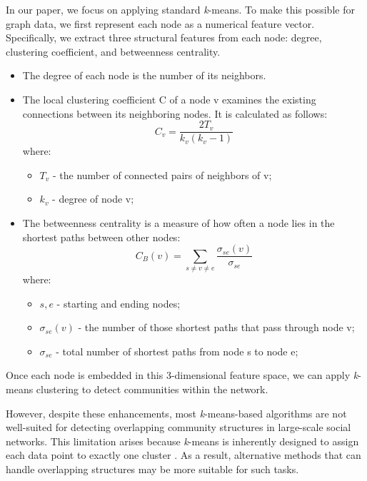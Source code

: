 \documentclass[conference]{IEEEtran}
\begin{document}
In our paper, we focus on applying standard \textit{k}-means. To make this possible for graph data, we first represent each node as a numerical feature vector. Specifically, we extract three structural features from each node: degree, clustering coefficient, and betweenness centrality\cite{dacunha2025identify}.
\begin{itemize}
    \item The degree of each node is the number of its neighbors.
    \item The local clustering coefficient C of a node v examines the existing connections between its neighboring nodes. It is calculated as follows:
    \begin{equation}
        C_v = \frac{2T_v}{k_v(k_v-1)}
    \end{equation}
    where:
    \begin{itemize}
        \item $T_v$ - the number of connected pairs of neighbors of v;
        \item $k_v$ - degree of node v;
    \end{itemize}
    \item The betweenness centrality is a measure of how often a node lies in the shortest paths between other nodes:
    \begin{equation}
        C_B(v)= \sum_{s\neq v\neq e} \frac{\sigma_{se}(v)}{\sigma_{se}}
    \end{equation}
    where:
    \begin{itemize}
        \item $s, e$ - starting and ending nodes;
        \item $\sigma_{se}(v)$ - the number of those shortest paths that pass through node v;
        \item $\sigma_{se}$ - total number of shortest paths from node s to node e;
    \end{itemize}
\end{itemize}

Once each node is embedded in this 3-dimensional feature space, we can apply \textit{k}-means clustering to detect communities within the network.

However, despite these enhancements, most \textit{k}-means-based algorithms are not well-suited for detecting overlapping community structures in large-scale social networks. This limitation arises because \textit{k}-means is inherently designed to assign each data point to exactly one cluster \cite{JAVED201887}\cite{Li2016CDAB}\cite{malode2025comparative}. As a result, alternative methods that can handle overlapping structures may be more suitable for such tasks.
\end{document}
